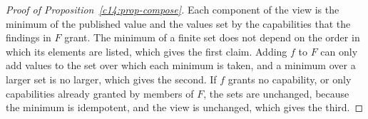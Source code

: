 \begin{proof}[Proof of Proposition~\ref{c14:prop-compose}]
Each component of the view is the minimum of the published value and the values set by
the capabilities that the findings in $F$ grant. The minimum of a finite set does not
depend on the order in which its elements are listed, which gives the first claim.
Adding $f$ to $F$ can only add values to the set over which each minimum is taken, and a
minimum over a larger set is no larger, which gives the second. If $f$ grants no
capability, or only capabilities already granted by members of $F$, the sets are
unchanged, because the minimum is idempotent, and the view is unchanged, which gives
the third.
\end{proof}
